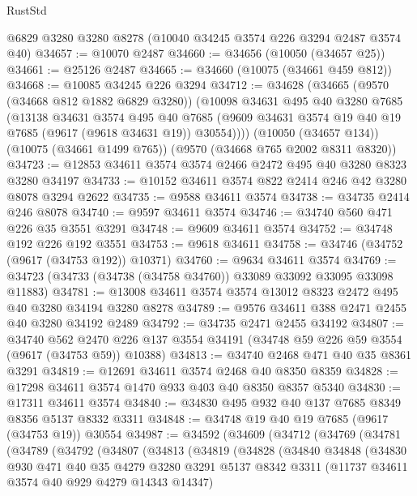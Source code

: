\begin{lexlean}{RustStd}
\begin{coremodule}
    @6829
    @3280
    @3280
    @8278
    (@10040 @34245 @3574 @226 @3294 @2487 @3574 @40)
@34657 := @10070 @2487
@34660 := @34656 (@10050 (@34657 @25))
@34661 := @25126 @2487
@34665 := @34660 (@10075 (@34661 @459 @812))
@34668 := @10085 @34245 @226 @3294
@34712 := @34628
    (@34665
      (@9570 (@34668 @812 @1882 @6829 @3280))
      (@10098
        @34631
        @495
        @40
        @3280
        @7685
        (@13138
          @34631
          @3574
          @495
          @40
          @7685
          (@9609 @34631 @3574 @19 @40 @19 @7685 (@9617 (@9618 @34631 @19)) @30554))))
    (@10050 (@34657 @134))
    (@10075 (@34661 @1499 @765))
    (@9570 (@34668 @765 @2002 @8311 @8320))
@34723 := @12853 @34611 @3574 @3574 @2466 @2472 @495 @40 @3280 @8323 @3280 @34197
@34733 := @10152 @34611 @3574 @822 @2414 @246 @42 @3280 @8078 @3294 @2622
@34735 := @9588 @34611 @3574
@34738 := @34735 @2414 @246 @8078
@34740 := @9597 @34611 @3574
@34746 := @34740 @560 @471 @226 @35 @3551 @3291
@34748 := @9609 @34611 @3574
@34752 := @34748 @192 @226 @192 @3551
@34753 := @9618 @34611
@34758 := @34746 (@34752 (@9617 (@34753 @192)) @10371)
@34760 := @9634 @34611 @3574
@34769 := @34723 (@34733 (@34738 (@34758 @34760)) @33089 @33092 @33095 @33098 @11883)
@34781 := @13008 @34611 @3574 @3574 @13012 @8323 @2472 @495 @40 @3280 @34194 @3280 @8278
@34789 := @9576 @34611 @388 @2471 @2455 @40 @3280 @34192 @2489
@34792 := @34735 @2471 @2455 @34192
@34807 := @34740
    @562
    @2470
    @226
    @137
    @3554
    @34191
    (@34748 @59 @226 @59 @3554 (@9617 (@34753 @59)) @10388)
@34813 := @34740 @2468 @471 @40 @35 @8361 @3291
@34819 := @12691 @34611 @3574 @2468 @40 @8350 @8359
@34828 := @17298 @34611 @3574 @1470 @933 @403 @40 @8350 @8357 @5340
@34830 := @17311 @34611 @3574
@34840 := @34830 @495 @932 @40 @137 @7685 @8349 @8356 @5137 @8332 @3311
@34848 := @34748 @19 @40 @19 @7685 (@9617 (@34753 @19)) @30554
@34987 := @34592
    (@34609
      (@34712
        (@34769
          (@34781
            (@34789
              (@34792
                (@34807
                  (@34813
                    (@34819
                      (@34828
                        (@34840
                          @34848
                          (@34830
                            @930
                            @471
                            @40
                            @35
                            @4279
                            @3280
                            @3291
                            @5137
                            @8342
                            @3311
                            (@11737 @34611 @3574 @40 @929 @4279 @14343 @14347)

\end{coremodule}
\end{lexlean}
